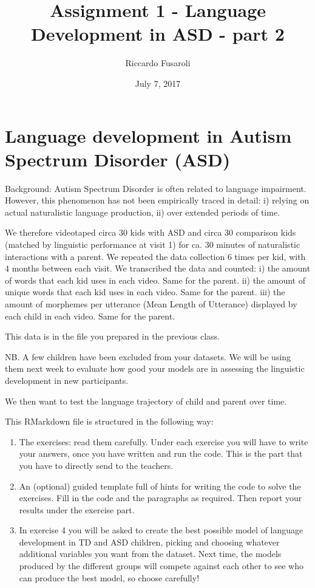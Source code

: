 \documentclass[]{article}
\title{Assignment 1 - Language Development in ASD - part 2}
\author{Riccardo Fusaroli}
\date{July 7, 2017}
\providecommand{\tightlist}{%
  \setlength{\itemsep}{0pt}\setlength{\parskip}{0pt}}
\begin{document}
\maketitle

\section{Language development in Autism Spectrum Disorder
(ASD)}\label{language-development-in-autism-spectrum-disorder-asd}

Background: Autism Spectrum Disorder is often related to language
impairment. However, this phenomenon has not been empirically traced in
detail: i) relying on actual naturalistic language production, ii) over
extended periods of time.

We therefore videotaped circa 30 kids with ASD and circa 30 comparison
kids (matched by linguistic performance at visit 1) for ca. 30 minutes
of naturalistic interactions with a parent. We repeated the data
collection 6 times per kid, with 4 months between each visit. We
transcribed the data and counted: i) the amount of words that each kid
uses in each video. Same for the parent. ii) the amount of unique words
that each kid uses in each video. Same for the parent. iii) the amount
of morphemes per utterance (Mean Length of Utterance) displayed by each
child in each video. Same for the parent.

This data is in the file you prepared in the previous class.

NB. A few children have been excluded from your datasets. We will be
using them next week to evaluate how good your models are in assessing
the linguistic development in new participants.

We then want to test the language trajectory of child and parent over
time.

This RMarkdown file is structured in the following way:

\begin{enumerate}
\def\labelenumi{\arabic{enumi}.}
\tightlist
\item
  The exercises: read them carefully. Under each exercise you will have
  to write your answers, once you have written and run the code. This is
  the part that you have to directly send to the teachers.
\item
  An (optional) guided template full of hints for writing the code to
  solve the exercises. Fill in the code and the paragraphs as required.
  Then report your results under the exercise part.
\item
  In exercise 4 you will be asked to create the best possible model of
  language development in TD and ASD children, picking and choosing
  whatever additional variables you want from the dataset. Next time,
  the models produced by the different groups will compete against each
  other to see who can produce the best model, so choose carefully!
\end{enumerate}
\end{document}
